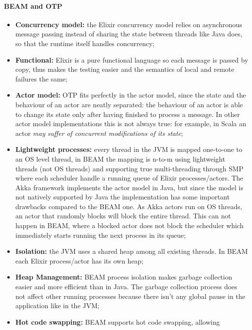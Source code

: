 \paragraph{BEAM and OTP}
\begin{itemize}
  \item \textbf{Concurrency model:} the Elixir concurrency model relies on
        asynchronous message passing instead of sharing the state between
        threads like Java does, so that the runtime itself handles concurrency;
  \item \textbf{Functional:} Elixir is a pure functional language so each
        message is passed by copy, thus makes the testing easier and the
        semantics of local and remote failures the same;
  \item \textbf{Actor model:} OTP fits perfectly in the actor model, since the
        state and the behaviour of an actor are neatly separated: the behaviour
        of an actor is able to change its state only after having finished to
        process a message.
        In other actor model implementations this is not always true: for
        example, in Scala an actor \textit{may suffer of concurrent
        modifications of its state};
  \item \textbf{Lightweight processes:} every thread in the JVM is mapped
        one-to-one to an OS level thread, in BEAM the mapping is n-to-m using
        lightweight threads (not OS threads) and supporting true multi-threading
        through SMP where each scheduler handle a running queue of Elixir
        processes/actors. The Akka framework implements the actor model in
        Java, but since the model is not natively supported by Java the
        implementation has some important drawbacks compared to the BEAM one.
        As Akka actors run on OS threads, an actor that randomly blocks will
        block the entire thread. This can not happen in BEAM, where a blocked
        actor does not block the scheduler which immediately starts running the
        next process in its queue;
  \item \textbf{Isolation:} the JVM uses a shared heap among all existing
        threads. In BEAM each Elixir process/actor has its own heap;
  \item \textbf{Heap Management:} BEAM process isolation makes garbage
        collection easier and more efficient than in Java. The garbage
        collection process does not affect other running processes because
        there isn't any global pause in the application like in the JVM;
    \item \textbf{Hot code swapping:} BEAM supports hot code swapping, allowing

\end{itemize}
